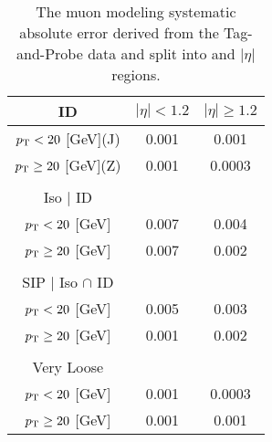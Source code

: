 \begin{table}[htbp]
\centering
\caption{The muon modeling systematic absolute error derived from the Tag-and-Probe data and split into \pt and $|\eta|$ regions. }
\label{tab:musysttable}
\begin{tabular}{|c|cc|}
\hline
ID & $|\eta|<1.2$ & $|\eta|\geq 1.2$  \\
\hline
$p_{\mathrm{T}} < 20$ [GeV](J) & 0.001 & 0.001  \\

$p_{\mathrm{T}} \geq 20$ [GeV](Z) &  0.001& 0.0003 \\

 &  & \\
\hline
Iso $|$ ID  &  &  \\
\hline
$p_{\mathrm{T}} < 20$ [GeV]  & 0.007 & 0.004  \\

$p_{\mathrm{T}} \geq 20$ [GeV] & 0.007 & 0.002  \\

 &  &  \\
\hline
SIP $|$ Iso $\cap$ ID &  &  \\
\hline
$p_{\mathrm{T}} < 20$ [GeV]& 0.005 & 0.003 \\

$p_{\mathrm{T}} \geq 20$ [GeV]& 0.001 & 0.002 \\
 & &  \\
\hline
Very Loose & &  \\
\hline
$p_{\mathrm{T}} < 20 $ [GeV]  & 0.001 & 0.0003 \\
$p_{\mathrm{T}} \geq 20$ [GeV]  & 0.001 & 0.001 \\
\hline
\end{tabular}
\label{tab:musyst}
\end{table}


